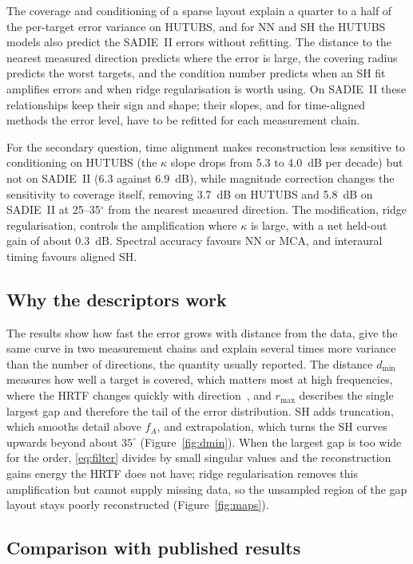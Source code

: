 \documentclass[11pt,a4paper]{article}
\newcommand{\dmin}{d_{\min}}
\newcommand{\rmax}{r_{\max}}
\begin{document}
The coverage and conditioning of a sparse layout explain a quarter to a half of the per-target error variance on HUTUBS, and for NN and SH the HUTUBS models also predict the SADIE~II errors without refitting. The distance to the nearest measured direction predicts where the error is large, the covering radius predicts the worst targets, and the condition number predicts when an SH fit amplifies errors and when ridge regularisation is worth using. On SADIE~II these relationships keep their sign and shape; their slopes, and for time-aligned methods the error level, have to be refitted for each measurement chain.

For the secondary question, time alignment makes reconstruction less sensitive to conditioning on HUTUBS (the $\kappa$ slope drops from 5.3 to 4.0~dB per decade) but not on SADIE~II (6.3 against 6.9~dB), while magnitude correction changes the sensitivity to coverage itself, removing 3.7~dB on HUTUBS and 5.8~dB on SADIE~II at 25--35$^\circ$ from the nearest measured direction. The modification, ridge regularisation, controls the amplification where $\kappa$ is large, with a net held-out gain of about 0.3~dB. Spectral accuracy favours NN or MCA, and interaural timing favours aligned SH.

\subsection{Why the descriptors work}

The results show how fast the error grows with distance from the data, give the same curve in two measurement chains and explain several times more variance than the number of directions, the quantity usually reported. The distance $\dmin$ measures how well a target is covered, which matters most at high frequencies, where the HRTF changes quickly with direction~\cite{zhang2010}, and $\rmax$ describes the single largest gap and therefore the tail of the error distribution. SH adds truncation, which smooths detail above $f_A$, and extrapolation, which turns the SH curves upwards beyond about $35^\circ$ (Figure~\ref{fig:dmin}). When the largest gap is too wide for the order, \eqref{eq:filter} divides by small singular values and the reconstruction gains energy the HRTF does not have; ridge regularisation removes this amplification but cannot supply missing data, so the unsampled region of the gap layout stays poorly reconstructed (Figure~\ref{fig:maps}).

\subsection{Comparison with published results}
\end{document}
